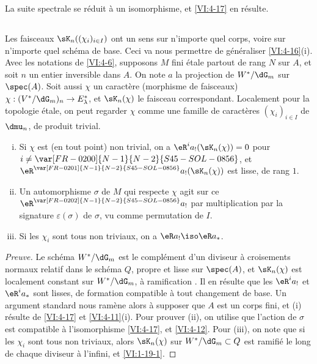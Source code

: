 La suite spectrale se réduit à un isomorphisme, et \ref{VI:4-17} en 
résulte. 





\subsection{}\label{VI:4-19}

Les faisceaux $\sK_n((\chi_i)_{i\in I})$ ont un sens sur n'importe quel corps, 
voire sur n'importe quel schéma de base. Ceci va nous permettre de généraliser 
\ref{VI:4-16}(i). Avec les notations de \ref{VI:4-6}, supposons $M$ fini 
étale partout de rang $N$ sur $A$, et soit $n$ un entier inversible dans $A$. 
On note $a$ la projection de $W^\ast/\dG_m$ sur $\spec(A)$. Soit aussi $\chi$ 
un caractère (morphisme de faisceaux) 
$\chi:(V^\ast/\dG_m)_n \to E_\lambda^\ast$, et $\sK_n(\chi)$ le faisceau 
correspondant. Localement pour la topologie étale, on peut regarder $\chi$ 
comme une famille de caractères $(\chi_i)_{i\in I}$ de $\dmu_n$, de produit 
trivial. 





\begin{proposition_}\label{VI:4-20}
\begin{enumerate}[(i)]
  \item Si $\chi$ est (en tout point) non trivial, on a 
    $\eR^i a_! (\sK_n(\chi)) = 0$ pour $i\ne \var[FR-0200]{N-1}{N-2}{S45-SOL-0856}$, et 
    $\eR^{\var[FR-0201]{N-1}{N-2}{S45-SOL-0856}} a_!(\sK_n(\chi))$ est lisse, de rang $1$. 
  \item Un automorphisme $\sigma$ de $M$ qui respecte $\chi$ agit sur ce 
    $\eR^{\var[FR-0202]{N-1}{N-2}{S45-SOL-0856}} a_!$ par multiplication par la signature $\varepsilon(\sigma)$ 
    de $\sigma$, vu comme permutation de $I$. 
  \item Si les $\chi_i$ sont tous non triviaux, on a $\eR a_! \iso \eR a_\ast$. 
\end{enumerate}
\end{proposition_}
\begin{proof}[Preuve]
Le schéma $W^\ast/\dG_m$ est le complément d'un diviseur à croisements 
normaux relatif dans le schéma $Q$, propre et lisse sur $\spec(A)$, et 
$\sK_n(\chi)$ est 
localement constant sur $W^\ast/\dG_m$, à ramification 
. Il en résulte que les $\eR^i a_!$ et 
$\eR^i a_\ast$ sont lisses, de formation compatible à tout changement de 
base. Un argument standard nous ramène alors à supposer que $A$ est un 
corps fini, et (i) résulte de \ref{VI:4-17} et \ref{VI:4-11}(i). Pour 
prouver (ii), on utilise que l'action de $\sigma$ est compatible à 
l'isomorphisme \ref{VI:4-17}, et \ref{VI:4-12}. Pour (iii), on note que si les 
$\chi_i$ sont tous non triviaux, alors $\sK_n(\chi)$ sur 
$W^\ast/\dG_m\subset Q$ est ramifié le long de chaque diviseur à l'infini, 
et \ref{VI:1-19-1}. 
\end{proof}











